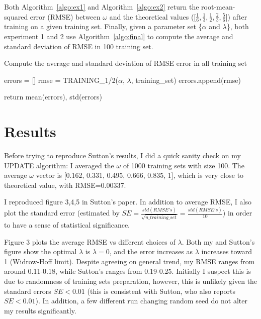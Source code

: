 \documentclass[conference]{IEEEtran}
\begin{document}
	Both Algorithm~\ref{algo:ex1} and Algorithm~\ref{algo:ex2} return the root-mean-squared error (RMSE) between $\omega$ and the theoretical values ([$\frac{1}{6},\frac{1}{3},\frac{1}{2},\frac{2}{3},\frac{5}{6}$]) after training on a given training set. Finally, given a parameter set \{$\alpha$ and $\lambda$\}, both experiment 1 and 2 use Algorithm~\ref{algo:final} to compute the average and standard deviation of RMSE in 100 training set.
	
	\begin{algorithm}[h!]
		\caption{Compute the average and standard deviation of RMSE error in all training set}
		\begin{algorithmic}
			\State errors = []
			\State rmse = TRAINING\_1/2($\alpha$, $\lambda$, training\_set)
			\State errors.append(rmse)
			\EndFor
			
			\State return mean(errors), std(errors)
			\EndFunction
		\end{algorithmic}
		\label{algo:final}
	\end{algorithm}
	
	\section{Results}
	Before trying to reproduce Sutton's results, I did a quick sanity check on my UPDATE algorithm: I averaged the $\omega$ of 1000 training sets with size 100. The average $\omega$ vector is [0.162, 0.331, 0.495, 0.666, 0.835, 1], which is very close to theoretical value, with RMSE=0.00337.
	
	I reproduced figure 3,4,5 in Sutton's paper. In addition to average RMSE, I also plot the standard error (estimated by $SE=\frac{std(RMSE's)}{\sqrt{n\_training\_set}}=\frac{std(RMSE's)}{10}$) in order to have a sense of statistical significance. 
	
	Figure 3 plots the average RMSE vs different choices of $\lambda$. Both my and Sutton's figure show the optimal $\lambda$ is $\lambda=0$, and the error increases as $\lambda$ increases toward 1 (Widrow-Hoff limit). Despite agreeing on general trend, my RMSE ranges from around 0.11-0.18, while Sutton's ranges from 0.19-0.25. Initially I suspect this is due to randomness of training sets preparation, however, this is unlikely given the standard errors $SE<0.01$ (this is consistent with Sutton, who also reports $SE<0.01$). In addition, a few different run changing random seed do not alter my results significantly.
	
\end{document}
